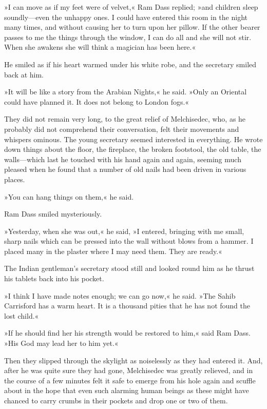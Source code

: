»I can move as if my feet were of velvet,« Ram Dass replied; »and children sleep soundly—even the unhappy ones. I could have entered this room in the night many times, and without causing her to turn upon her pillow. If the other bearer passes to me the things through the window, I can do all and she will not stir. When she awakens she will think a magician has been here.«

He smiled as if his heart warmed under his white robe, and the secretary smiled back at him.

»It will be like a story from the Arabian Nights,« he said. »Only an Oriental could have planned it. It does not belong to London fogs.«

They did not remain very long, to the great relief of Melchisedec, who, as he probably did not comprehend their conversation, felt their movements and whispers ominous. The young secretary seemed interested in everything. He wrote down things about the floor, the fireplace, the broken footstool, the old table, the walls—which last he touched with his hand again and again, seeming much pleased when he found that a number of old nails had been driven in various places.

»You can hang things on them,« he said.

Ram Dass smiled mysteriously.

»Yesterday, when she was out,« he said, »I entered, bringing with me small, sharp nails which can be pressed into the wall without blows from a hammer. I placed many in the plaster where I may need them. They are ready.«

The Indian gentleman's secretary stood still and looked round him as he thrust his tablets back into his pocket.

»I think I have made notes enough; we can go now,« he said. »The Sahib Carrisford has a warm heart. It is a thousand pities that he has not found the lost child.«

»If he should find her his strength would be restored to him,« said Ram Dass. »His God may lead her to him yet.«

Then they slipped through the skylight as noiselessly as they had entered it. And, after he was quite sure they had gone, Melchisedec was greatly relieved, and in the course of a few minutes felt it safe to emerge from his hole again and scuffle about in the hope that even such alarming human beings as these might have chanced to carry crumbs in their pockets and drop one or two of them.